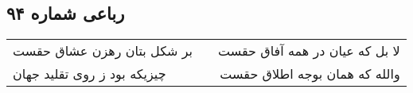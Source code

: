 \begin{center}
\section*{رباعی شماره ۹۴}
\label{sec:sh094}
\begin{longtable}{l p{0.5cm} r}
بر شکل بتان رهزن عشاق حقست
&&
لا بل که عیان در همه آفاق حقست
\\
چیزیکه بود ز روی تقلید جهان
&&
والله که همان بوجه اطلاق حقست
\\
\end{longtable}
\end{center}

